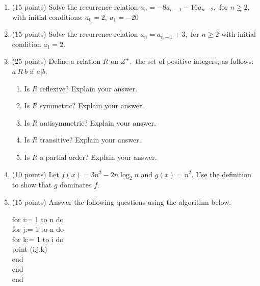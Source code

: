 \pagestyle{empty} \setlength{\topmargin}{-.5in}
\addtolength{\textheight}{2in} \addtolength{\oddsidemargin}{-1in}
\addtolength{\textwidth}{2in} \setlength{\parindent}{0pt}
\newcommand{\real}{\mathbb{R}}
\newcommand{\un}{\mathcal{U}}
\newcommand{\z}{\mathbb{Z}}

\Large{
\phantom{space}
\vfill
{}
\vfill
\newpage

\begin{enumerate}

\item (15 points) Solve the recurrence relation $a_n=-8a_{n-1}-16a_{n-2}, $ for $n \geq 2,$
with initial conditions: $a_0=2, \: a_1= -20$
\vfill

\item (15 points)  Solve the recurrence relation $a_n = a_{n-1} +3,$ for $n \geq 2$
with initial condition $a_1=2.$ \vspace{3in}
\newpage
\item (25 points) Define a relation $R$ on $Z^+,$ the set of positive integers,
 as follows: $a \: R \: b$ if $a|b.$
\begin{enumerate}\item Is $R$ reflexive? Explain your answer.
\vfill
\item Is $R$ symmetric? Explain your answer.
\vfill
\item Is $R$ antisymmetric? Explain your answer.
\vfill
\item Is $R$ transitive? Explain your answer.\vfill
\item Is $R$ a partial order? Explain your answer.
\vfill
\end{enumerate}
\newpage

\item (10 points) Let $f(x)=3n^2-2n \log_2 n$ and $g(x)=n^2.$
Use the definition to show that $g$ dominates $f.$\vfill

\item (15 points) Answer the following questions using the algorithm below.\\
\bigskip

 for i:= 1 to n do \\
 \hspace{.2in} for j:= 1 to n do \\
 \hspace{.4in} for k:= 1 to i do \\
 \hspace{.6in} print (i,j,k) \\
 \hspace{.4in} end \\
 \hspace{.2in} end \\
 end \\


\end{enumerate}}

